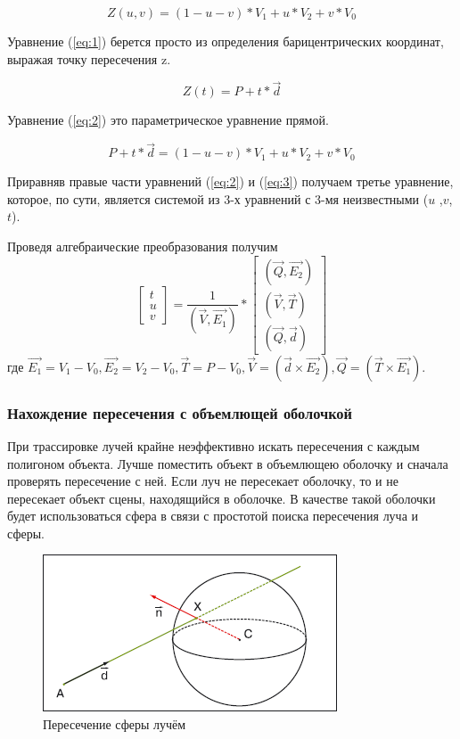 \begin{equation}
	Z(u, v) = (1 - u - v)*V_{1} + u*V_{2} + v*V_{0}
	\label{eq:1}
\end{equation}

Уравнение (\ref{eq:1}) берется просто из определения барицентрических координат, выражая точку пересечения z.

\begin{equation}
	Z(t) = P + t*\vec{d}
	\label{eq:2}
\end{equation}

Уравнение (\ref{eq:2}) это параметрическое уравнение прямой.

\begin{equation}
	P + t*\vec{d} = (1 - u - v)*V_{1} + u*V_{2} + v*V_{0}
	\label{eq:3}
\end{equation}

Приравняв правые части уравнений (\ref{eq:2}) и (\ref{eq:3}) получаем третье уравнение, которое, по сути, является системой из 3-х уравнений с 3-мя неизвестными ($u$ ,$v$, $t$).

Проведя алгебраические преобразования получим
\[
\begin{bmatrix}
	t\\
	u\\
	v
\end{bmatrix}
= \frac{1}{(\vec{V}, \vec{E_{1}})}*
\begin{bmatrix}
	(\vec{Q}, \vec{E_{2}})\\
	(\vec{V}, \vec{T})\\
	(\vec{Q}, \vec{d})
\end{bmatrix}
\]
где $\vec{E_{1}} = V_{1} - V_{0}, \vec{E_{2}} = V_{2} - V_{0}, \vec{T} = P - V_{0}, \vec{V} = (\vec{d} \times \vec{E_{2}}), \vec{Q} = (\vec{T} \times \vec{E_{1}})$.

\subsubsection{Нахождение пересечения с объемлющей оболочкой}

При трассировке лучей крайне неэффективно искать пересечения с каждым полигоном объекта. Лучше поместить объект в объемлющею оболочку и сначала проверять пересечение с ней. Если луч не пересекает оболочку, то и не пересекает объект сцены, находящийся в оболочке. В качестве такой оболочки будет использоваться сфера в связи с простотой поиска пересечения луча и сферы.

\begin{figure}[htp]
	\centering
	\includegraphics{img/sphere.png}
	\caption{Пересечение сферы лучём}
	\label{fig:sphere}
\end{figure}	

